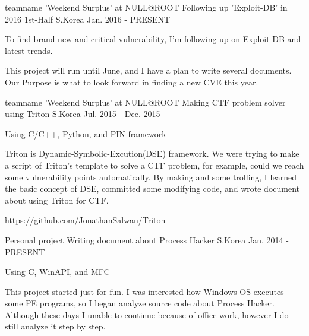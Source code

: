 \begin{cventries}
  \cventry
    {teamname 'Weekend Surplus' at NULL@ROOT}
    {Following up 'Exploit-DB' in 2016 1st-Half}
    {S.Korea}
    {Jan. 2016 - PRESENT}
    {
      \begin{cvitems}
        \item {To find brand-new and critical vulnerability, I'm following up on Exploit-DB and latest trends.}
        \item {This project will run until June, and I have a plan to write several documents. Our Purpose is what to look forward in finding a new CVE this year.}
      \end{cvitems}
    }
  \cventry
    {teamname 'Weekend Surplus' at NULL@ROOT}
    {Making CTF problem solver using Triton}
    {S.Korea}
    {Jul. 2015 - Dec. 2015}
    {
      \begin{cvitems}
        \item {Using C/C++, Python, and PIN framework}
        \item {Triton is Dynamic-Symbolic-Excution(DSE) framework. We were trying to make a script of Triton's template to solve a CTF problem, for example, could we reach some vulnerability points automatically. By making and some trolling, I learned the basic concept of DSE, committed some modifying code, and wrote document about using Triton for CTF.}
        \item {https://github.com/JonathanSalwan/Triton}
      \end{cvitems}
    }
  \cventry
    {Personal project}
    {Writing document about Process Hacker}
    {S.Korea}
    {Jan. 2014 - PRESENT}
    {
      \begin{cvitems}
        \item {Using C, WinAPI, and MFC}
        \item {This project started just for fun. I was interested how Windows OS executes some PE programs, so I began analyze source code about Process Hacker. Although these days I unable to continue because of office work, however I do still analyze it step by step.}
      \end{cvitems}
    }


\end{cventries}
